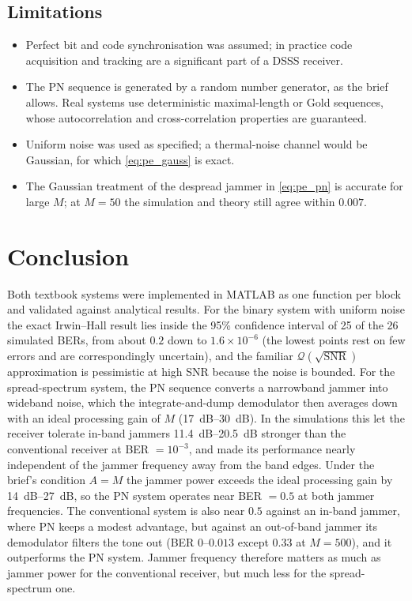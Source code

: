 \documentclass[11pt,a4paper]{article}
\newcommand{\Q}{\mathcal{Q}}
\newcommand{\snr}{\mathrm{SNR}}
\begin{document}
\subsection{Limitations}

\begin{itemize}
  \item Perfect bit and code synchronisation was assumed; in practice code
        acquisition and tracking are a significant part of a DSSS receiver.
  \item The PN sequence is generated by a random number generator, as the brief
        allows. Real systems use deterministic maximal-length or Gold sequences, whose
        autocorrelation and cross-correlation properties are guaranteed.
  \item Uniform noise was used as specified; a thermal-noise channel would be
        Gaussian, for which \cref{eq:pe_gauss} is exact.
  \item The Gaussian treatment of the despread jammer in \cref{eq:pe_pn} is
        accurate for large $M$; at $M=50$ the simulation and theory still agree
        within $0.007$.
\end{itemize}

\section{Conclusion}

Both textbook systems were implemented in MATLAB as one function per block and
validated against analytical results. For the binary system with uniform noise the
exact Irwin--Hall result lies inside the 95\% confidence interval of 25 of the 26
simulated BERs, from about $0.2$ down to $1.6\times10^{-6}$ (the lowest points rest
on few errors and are correspondingly uncertain), and the familiar $\Q(\sqrt{\snr})$ approximation is pessimistic at high SNR because the
noise is bounded. For the spread-spectrum system, the PN sequence converts a
narrowband jammer into wideband noise, which the integrate-and-dump demodulator then
averages down with an ideal processing gain of $M$ (\SIrange{17}{30}{dB}). In the
simulations this let the receiver tolerate in-band jammers \SIrange{11.4}{20.5}{dB}
stronger than the conventional receiver at BER $=10^{-3}$, and made its
performance nearly independent of the jammer frequency away from the band edges. Under the brief's condition $A=M$
the jammer power exceeds the ideal processing gain by \SIrange{14}{27}{dB}, so the
PN system operates near BER $=0.5$ at both jammer frequencies. The conventional system
is also near $0.5$ against an in-band jammer, where PN keeps a modest advantage, but
against an out-of-band jammer its demodulator filters the tone out (BER $0$--$0.013$
except $0.33$ at $M=500$), and it outperforms the PN system. Jammer frequency therefore
matters as much as jammer power for the conventional receiver, but much less for the
spread-spectrum one.
\end{document}
